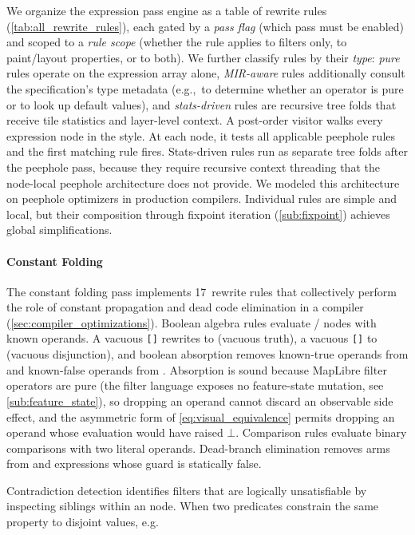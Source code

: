 We organize the expression pass engine as a table of rewrite rules (\cref{tab:all_rewrite_rules}), each gated by a \emph{pass flag} (which pass must be enabled) and scoped to a \emph{rule scope} (whether the rule applies to filters only, to paint/layout properties, or to both).
We further classify rules by their \emph{type}:
	\emph{pure} rules operate on the expression array alone,
	\emph{MIR-aware} rules additionally consult the specification's type metadata (e.g.,\ to determine whether an operator is pure or to look up default values), and
	\emph{stats-driven} rules are recursive tree folds that receive tile statistics and layer-level context.
A post-order visitor walks every expression node in the style.
At each node, it tests all applicable peephole rules and the first matching rule fires.
Stats-driven rules run as separate tree folds after the peephole pass, because they require recursive context threading that the node-local peephole architecture does not provide.
We modeled this architecture on peephole optimizers in production compilers.
Individual rules are simple and local, but their composition through fixpoint iteration (\cref{sub:fixpoint}) achieves global simplifications.

\paragraph{Constant Folding}
The constant folding pass implements 17~rewrite rules that collectively perform the role of constant propagation and dead code elimination in a compiler (\cref{sec:compiler_optimizations}).
Boolean algebra rules evaluate /  nodes with known operands.
A vacuous \texttt{[]} rewrites to  (vacuous truth), a vacuous \texttt{[]} to  (vacuous disjunction), and boolean absorption removes known-true operands from  and known-false operands from .
Absorption is sound because MapLibre filter operators are pure (the filter language exposes no feature-state mutation, see \cref{sub:feature_state}), so dropping an operand cannot discard an observable side effect, and the asymmetric form of \cref{eq:visual_equivalence} permits dropping an operand whose evaluation would have raised $\bot$.
Comparison rules evaluate binary comparisons with two literal operands.
Dead-branch elimination removes arms from  and  expressions whose guard is statically false.

Contradiction detection identifies filters that are logically unsatisfiable by inspecting siblings within an  node.
When two predicates constrain the same property to disjoint values, e.g.

